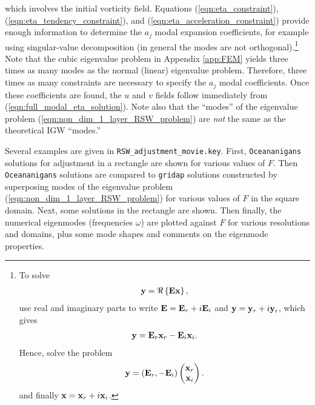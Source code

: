 \documentclass[10pt,reqno]{amsart}
\begin{document}
which involves the initial vorticity field.
Equations (\ref{eqn:eta_constraint}), (\ref{eqn:eta_tendency_constraint}), and (\ref{eqn:eta_acceleration_constraint}) provide enough information to determine the $a_j$ modal expansion coefficients, for example using singular-value decomposition (in general the modes are not orthogonal).\footnote{To solve
\begin{align}
{\bf y} = \Re \left\{ {\bf E} {\bf x} \right\} ,
\end{align}
use real and imaginary parts to write ${\bf E} = {\bf E}_r + i {\bf E}_i$ and ${\bf y} = {\bf y}_r + i {\bf y}_i$, which gives
\begin{align}
{\bf y} =  {\bf E}_r {\bf x}_r -{\bf E}_i {\bf x}_i .
\end{align}
Hence, solve the problem
\begin{align}
{\bf y} = \left({\bf E}_r ,  -{\bf E}_i \right)  
\begin{pmatrix} {\bf x}_r \\
{\bf x}_i 
\end{pmatrix}.
\end{align}
and finally ${\bf x} = {\bf x}_r + i {\bf x}_i$.
}
Note that the cubic eigenvalue problem in Appendix \ref{app:FEM} yields three times as many modes as the normal (linear) eigenvalue problem. 
Therefore, three times as many constraints are necessary to specify the $a_j$ modal coefficients.
Once these coefficients are found, the $u$ and $v$ fields follow immediately from (\ref{eqn:full_modal_eta_solution}).
Note also that the ``modes'' of the eigenvalue problem (\ref{eqn:non_dim_1_layer_RSW_problem}) are {\it not} the same as the theoretical IGW ``modes.''

Several examples are given in \texttt{RSW\_adjustment\_movie.key}. First, \texttt{Oceananigans} solutions for adjustment in a rectangle are shown for various values of $F$. Then \texttt{Oceananigans} solutions are compared to \texttt{gridap} solutions constructed by superposing modes of the eigenvalue problem (\ref{eqn:non_dim_1_layer_RSW_problem}) for various values of $F$ in the square domain.
Next, some solutions in the rectangle are shown.
Then finally, the numerical eigenmodes (frequencies $\omega$) are plotted against $F$ for various resolutions and domains, plus some mode shapes and comments on the eigenmode properties.
\end{document}
